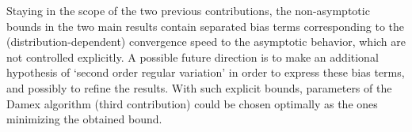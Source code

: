 %
Staying in the scope of the two previous contributions, the non-asymptotic bounds in the two main results contain separated bias terms corresponding to the (distribution-dependent) convergence speed to the asymptotic behavior, which are not controlled explicitly.
A possible future direction is to make an additional hypothesis
of  `second order regular variation'  \citep[see \emph{e.g.}][]{deHaan1996}
in order to express these bias terms, and possibly to refine the results.
With such explicit bounds, parameters of the Damex algorithm (third contribution) could be chosen optimally as the ones minimizing the obtained bound.
 
